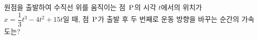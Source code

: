 원점을 출발하여 수직선 위를 움직이는 점~$\mathrm{P}$의 시각 $t$에서의 위치가 $x=\dfrac{1}{3}t^3-4t^2+15t$일 때, 점~$\mathrm{P}$가 출발 후 두 번째로 운동 방향을 바꾸는 순간의 가속도는?
